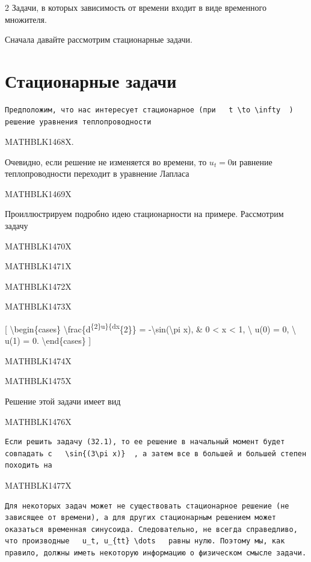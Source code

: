 \documentclass[
]{article}
\begin{document}
2 Задачи, в которых зависимость от времени входит в виде временного
множителя.

Сначала давайте рассмотрим стационарные задачи.

\section{Стационарные
задачи}\label{ux441ux442ux430ux446ux438ux43eux43dux430ux440ux43dux44bux435-ux437ux430ux434ux430ux447ux438}

\begin{verbatim}
Предположим, что нас интересует стационарное (при   t \to \infty  ) решение уравнения теплопроводности
\end{verbatim}

MATHBLK1468X.

Очевидно, если решение не изменяется во времени, то \(u_t = 0\)и
равнение теплопроводности переходит в уравнение Лапласа

MATHBLK1469X

Проиллюстрируем подробно идею стационарности на примере. Рассмотрим
задачу

MATHBLK1470X

MATHBLK1471X

MATHBLK1472X

MATHBLK1473X

{[} \textbackslash begin\{cases\}
\textbackslash frac\{d\textsuperscript{\{2\}u\}\{dx}\{2\}\} =
-\textbackslash sin(\textbackslash pi x), \& 0 \textless{} x \textless{}
1, \textbackslash{} u(0) = 0, \textbackslash{} u(1) = 0.
\textbackslash end\{cases\} {]}

MATHBLK1474X

MATHBLK1475X

Решение этой задачи имеет вид

MATHBLK1476X

\begin{verbatim}
Если решить задачу (32.1), то ее решение в начальный момент будет совпадать с   \sin{(3\pi x)}  , а затем все в большей и большей степен походить на
\end{verbatim}

MATHBLK1477X

\begin{verbatim}
Для некоторых задач может не существовать стационарное решение (не зависящее от времени), а для других стационарным решением может оказаться временная синусоида. Следовательно, не всегда справедливо, что производные   u_t, u_{tt} \dots   равны нулю. Поэтому мы, как правило, должны иметь некоторую информацию о физическом смысле задачи.
\end{verbatim}
\end{document}
